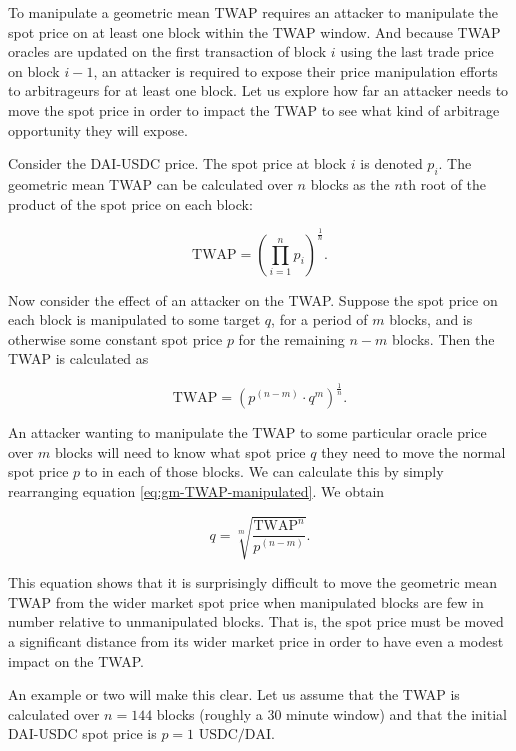 \documentclass[a4paper, 11pt]{article}
\begin{document}
To manipulate a geometric mean TWAP requires an attacker to manipulate the spot price on at least one block within the TWAP window. And because TWAP oracles are updated on the first transaction of block $i$ using the last trade price on block $i - 1$, an attacker is required to expose their price manipulation efforts to arbitrageurs for at least one block. Let us explore how far an attacker needs to move the spot price in order to impact the TWAP to see what kind of arbitrage opportunity they will expose. 

Consider the DAI-USDC price. The spot price at block $i$ is denoted $p_i$. The geometric mean TWAP can be calculated over $n$ blocks as the $n$th root of the product of the spot price on each block:

\begin{equation}
\text{TWAP}
=
\left( \prod_{i=1}^n p_i \right)^{\frac{1}{n}}.
\end{equation}

Now consider the effect of an attacker on the TWAP. Suppose the spot price on each block is manipulated to some target $q$, for a period of $m$ blocks, and is otherwise some constant spot price $p$ for the remaining $n - m$ blocks. Then the TWAP is calculated as

\begin{equation}
\label{eq:gm-TWAP-manipulated}
\text{TWAP}
=
\left( p^{(n-m)} \cdot q^m \right)^{\frac{1}{n}}.
\end{equation}

An attacker wanting to manipulate the TWAP to some particular oracle price over $m$ blocks will need to know what spot price $q$ they need to move the normal spot price $p$ to in each of those blocks. We can calculate this by simply rearranging equation \eqref{eq:gm-TWAP-manipulated}. We obtain

\begin{equation}
\label{eq:gm-spot-manipulated}
q
=
\sqrt[m]{\frac{\text{TWAP}^n}{p^{(n-m)}}}.
\end{equation}

This equation shows that it is surprisingly difficult to move the geometric mean TWAP from the wider market spot price when manipulated blocks are few in number relative to unmanipulated blocks. That is, the spot price must be moved a significant distance from its wider market price in order to have even a modest impact on the TWAP. 

An example or two will make this clear. Let us assume that the TWAP is calculated over $n = 144$ blocks (roughly a 30 minute window) and that the initial DAI-USDC spot price is $p = 1 \text{ USDC} / \text{DAI}$. 
\end{document}
